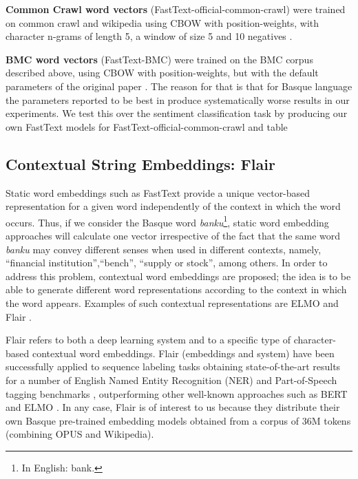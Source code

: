 \documentclass[10pt, a4paper]{article}
\begin{document}
\textbf{Common Crawl word vectors} (FastText-official-common-crawl) were trained on common crawl and wikipedia using CBOW with position-weights, with character n-grams of length 5, a window of size 5 and 10 negatives .  \cite{fasttext2_grave2018learning}

\textbf{BMC word vectors} (FastText-BMC) were trained on the BMC corpus described above, using CBOW with position-weights, but with the default parameters of the original paper \cite{fasttext1_bojanowski2017enriching}. The reason for that is that for Basque language the parameters reported to be best in \cite{fasttext2_grave2018learning} produce systematically worse results in our experiments. We test this over the sentiment classification task by producing our own FastText models for  
FastText-official-common-crawl and 
table

\subsection{Contextual String Embeddings: Flair}\label{sec:build-basq-models:flair}

Static word embeddings such as FastText \cite{fasttext1_bojanowski2017enriching} provide a unique vector-based representation for a given word independently of the context in which the word occurs. Thus, if we consider the Basque word \emph{banku}\footnote{In English: bank.}, static word embedding approaches will calculate one vector irrespective of the fact that the same word \emph{banku} may convey different senses when used in different contexts, namely, ``financial institution'',``bench'', ``supply or stock'', among others. In order to address this problem, contextual word embeddings are proposed; the idea is to be able to generate different word representations according to the context in which the word appears. Examples of such contextual representations are ELMO \cite{Peters:2018} and Flair \cite{akbik2018coling}.

Flair refers to both a deep learning system and to a specific type of character-based contextual word embeddings. Flair (embeddings and system) have been successfully applied to sequence labeling tasks obtaining state-of-the-art results for a number of English Named Entity Recognition (NER) and Part-of-Speech tagging benchmarks \cite{akbik2018coling}, outperforming other well-known approaches such as BERT and ELMO \cite{devlin2019bert,Peters:2018}. In any case, Flair is of interest to us because they distribute their own Basque pre-trained embedding models obtained from a corpus of 36M tokens (combining OPUS and Wikipedia).
\end{document}
